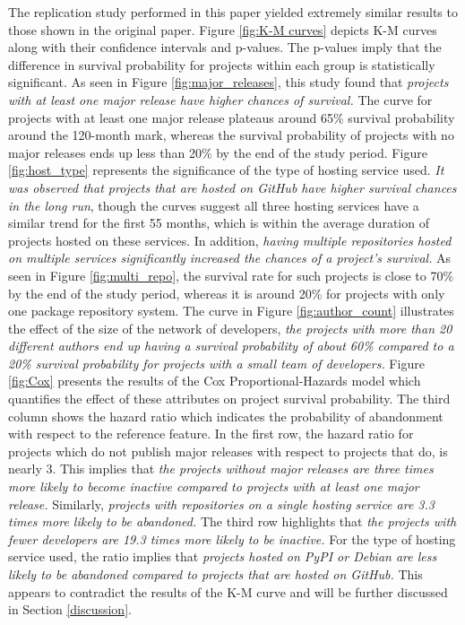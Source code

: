 \documentclass[sigconf,review]{acmart}
\begin{document}
The replication study performed in this paper yielded extremely similar results to those shown in the original paper. 
Figure \ref{fig:K-M curves} depicts K-M curves along with their confidence intervals and p-values. 
The p-values imply that the difference in survival probability for projects within each group is statistically significant.
As seen in Figure \ref{fig:major_releases}, this study found that \emph{projects with at least one major release have higher chances of survival.} 
The curve for projects with at least one major release plateaus around 65\% survival probability around the 120-month mark, whereas the survival probability of projects with no major releases ends up less than 20\% by the end of the study period. 
Figure \ref{fig:host_type} represents the significance of the type of hosting service used. \emph{It was observed that projects that are hosted on GitHub have higher survival chances in the long run}, though the curves suggest all three hosting services have a similar trend for the first 55 months, which is within the average duration of projects hosted on these services.
In addition, \emph{having multiple repositories hosted on multiple services significantly increased the chances of a project's survival.}
As seen in Figure \ref{fig:multi_repo}, the survival rate for such projects is close to 70\% by the end of the study period, whereas it is around 20\% for projects with only one package repository system. 
The curve in Figure \ref{fig:author_count} illustrates the effect of the size of the network of developers, \emph{the projects with more than 20 different authors end up having a survival probability of about 60\% compared to a 20\% survival probability for projects with a small team of developers.
}
Figure \ref{fig:Cox} presents the results of the Cox Proportional-Hazards model which quantifies the effect of these attributes on project survival probability. 
The third column shows the hazard ratio which indicates the probability of abandonment with respect to the reference feature.
In the first row, the hazard ratio for projects which do not publish major releases with respect to projects that do, is nearly 3. 
This implies that \emph{the projects without major releases are three times more likely to become inactive compared to projects with at least one major release.} 
Similarly, \emph{projects with repositories on a single hosting service are 3.3 times more likely to be abandoned.}
The third row highlights that \emph{the projects with fewer developers are 19.3 times more likely to be inactive.}
For the type of hosting service used, the ratio implies that \emph{projects hosted on PyPI or Debian are less likely to be abandoned compared to projects that are hosted on GitHub.} 
This appears to contradict the results of the K-M curve and will be further discussed in Section \ref{discussion}.
\end{document}
